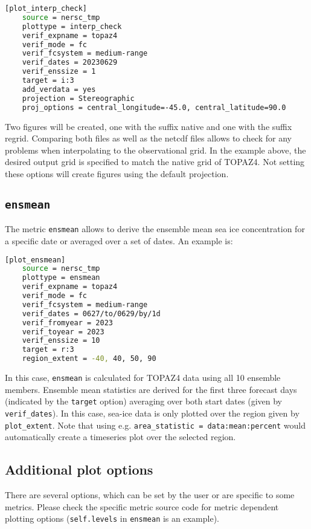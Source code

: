 \documentclass[DIV=10, parskip=full]{scrreprt}
\begin{document}
\begin{lstlisting}[language=bash, float]
	[plot_interp_check]
	source = nersc_tmp
	plottype = interp_check
	verif_expname = topaz4
	verif_mode = fc
	verif_fcsystem = medium-range
	verif_dates = 20230629
	verif_enssize = 1
	target = i:3
	add_verdata = yes
	projection = Stereographic
	proj_options = central_longitude=-45.0, central_latitude=90.0
\end{lstlisting}

Two figures will be created, one with the suffix native and one with the suffix regrid. Comparing both files as well as the netcdf files allows to check for any problems when interpolating to the observational grid. In the example above, the desired output grid is specified to match the native grid of TOPAZ4. Not setting these options will create figures using the default projection.   

\subsection{\texttt{ensmean}}
The metric \texttt{ensmean} allows to derive the ensemble mean sea ice concentration for a specific date or averaged over a set of dates. An example is:

\begin{lstlisting}[language=bash, float]
	[plot_ensmean]
	source = nersc_tmp
	plottype = ensmean
	verif_expname = topaz4
	verif_mode = fc
	verif_fcsystem = medium-range
	verif_dates = 0627/to/0629/by/1d
	verif_fromyear = 2023
	verif_toyear = 2023
	verif_enssize = 10
	target = r:3
	region_extent = -40, 40, 50, 90
\end{lstlisting}

In this case, \texttt{ensmean} is calculated for TOPAZ4 data using all 10 ensemble members. Ensemble mean statistics are derived for the first three forecast days (indicated by the \texttt{target} option) averaging over both start dates (given by \texttt{verif\_dates}). In this case, sea-ice data is only plotted over the region given by \texttt{plot\_extent}. Note that using e.g. \texttt{area\_statistic = data:mean:percent} would automatically create a timeseries plot over the selected region.


\subsection{Additional plot options}\label{subsec:add_options}
There are several options, which can be set by the user or are specific to some metrics. Please check the specific metric source code for metric dependent plotting options (\texttt{self.levels} in \texttt{ensmean} is an example).\\
\end{document}
